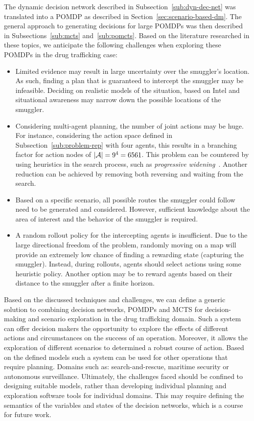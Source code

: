 \documentclass[conference]{IEEEtran}
\begin{document}
The dynamic decision network described in Subsection~\ref{sub:dyn-dec-net} was translated into a POMDP as described in Section~\ref{sec:scenario-based-dm}. The general approach to generating decisions for large POMDPs was then described in Subsections~\ref{sub:mcts} and~\ref{sub:pomcts}. Based on the literature researched in these topics, we anticipate the following challenges when exploring these POMDPs in the drug trafficking case:
\begin{itemize}
\item Limited evidence may result in large uncertainty over the smuggler's location. As such, finding a plan that is guaranteed to intercept the smuggler may be infeasible. Deciding on realistic models of the situation, based on Intel and situational awareness may narrow down the possible locations of the smuggler.
\item Considering multi-agent planning, the number of joint actions may be huge. For instance, considering the action space defined in Subsection~\ref{sub:problem-rep} with four agents, this results in a branching factor for action nodes of $\left\vert{\mathcal{A}}\right\vert=9^4=6561$. This problem can be countered by using heuristics in the search process, such as \emph{progressive widening}~\cite{chaslot2008progressive}. Another reduction can be achieved by removing both reversing \cite{realtime2014} and waiting from the search.
\item Based on a specific scenario, all possible routes the smuggler could follow need to be generated and considered. However, sufficient knowledge about the area of interest and the behavior of the smuggler is required.
\item A random rollout policy for the intercepting agents is insufficient. Due to the large directional freedom of the problem, randomly moving on a map will provide an extremely low chance of finding a rewarding state (\ie capturing the smuggler). Instead, during rollouts, agents should select actions using some heuristic policy. Another option may be to reward agents based on their distance to the smuggler after a finite horizon.
\end{itemize}

Based on the discussed techniques and challenges, we can define a generic solution to combining decision networks, POMDPs and MCTS for decision-making and scenario exploration in the drug trafficking domain. Such a system can offer decision makers the opportunity to explore the effects of different actions and circumstances on the success of an operation. Moreover, it allows the exploration of different scenarios to determined a robust course of action.
Based on the defined models such a system can be used for other operations that require planning. Domains such as: search-and-rescue, maritime security or autonomous surveillance. Ultimately, the challenges faced should be confined to designing suitable models, rather than developing individual planning and exploration software tools for individual domains. This may require defining the semantics of the variables and states of the decision networks, which is a course for future work.



\end{document}
